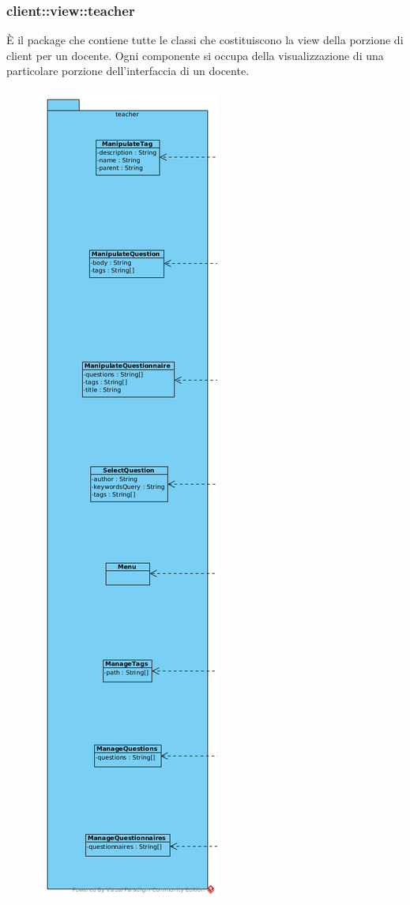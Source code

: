 \subsubsection{client::view::teacher}
È il package che contiene tutte le classi che costituiscono la view della porzione di client per un docente. Ogni componente si occupa della visualizzazione di una particolare porzione dell'interfaccia di un docente.\begin{center}
		\begin{figure}[H]
			\centering \includegraphics[scale=4, max width=\textwidth, max height=\myheight]{../img/diagrammiClassi/client/view/teacher.png}

\end{figure}
\end{center}
